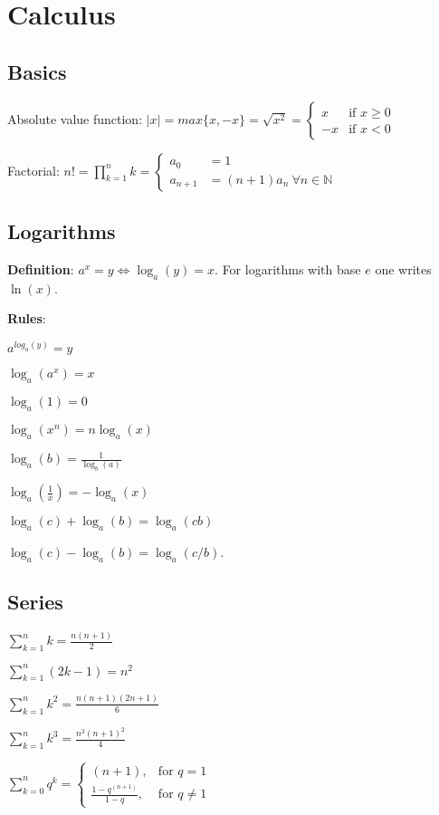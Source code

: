    
\chapter{Calculus}

\section{Basics}

Absolute value function: $ \left|x\right| = max\{x,-x\} = \sqrt{x^2} = \begin{cases}
																		x & \text{if } x\geq0\\
																		-x & \text{if } x<0
																	\end{cases} $

Factorial: $ n! = \prod_{k=1}^{n}k  = \begin{cases}
										a_0 &= 1\\
										a_{n+1} &= (n+1)a_n \ \forall n \in \mathbb{N}
										\end{cases} $

\section{Logarithms}
{\bf Definition}: $a^x=y\Leftrightarrow\log_a(y)=x $. For logarithms with
base $e$ one writes $\ln(x)$.

{\bf Rules}:
\begin{multicols}{2}

 $a^{log_a(y)}=y $
 
 $\log_a(a^x)=x$
 
 $\log_a(1)=0$
 
 $\log_a(x^n)=n\log_a(x)$

 $\log_a(b)=\frac{1}{\log_b(a)}$
 
 $\log_a(\frac{1}{x})=-\log_a(x)$
  
 $\log_a(c)+\log_a(b)=\log_a(cb)$
 
 $\log_a(c)-\log_a(b)=\log_a(c/b)$.
 
\end{multicols}


\section{Series}	
\begin{multicols}{3}
	
$ \sum_{k=1}^n k = \frac{n(n+1)}{2} $

$ \sum_{k=1}^n (2k-1) = n^2 $

$ \sum_{k=1}^n k^2 = \frac{n(n+1)(2n+1)}{6} $

$ \sum_{k=1}^n k^3 = \frac{n^2(n+1)^2}{4} $

$
\sum_{k=0}^{n}q^k = \begin{cases}
                         (n+1), & \text{for } q=1\\
                         \frac{1-q^{(n+1)}}{1-q}, & \text{for } q\neq1
                    \end{cases}
$
	
\end{multicols}

